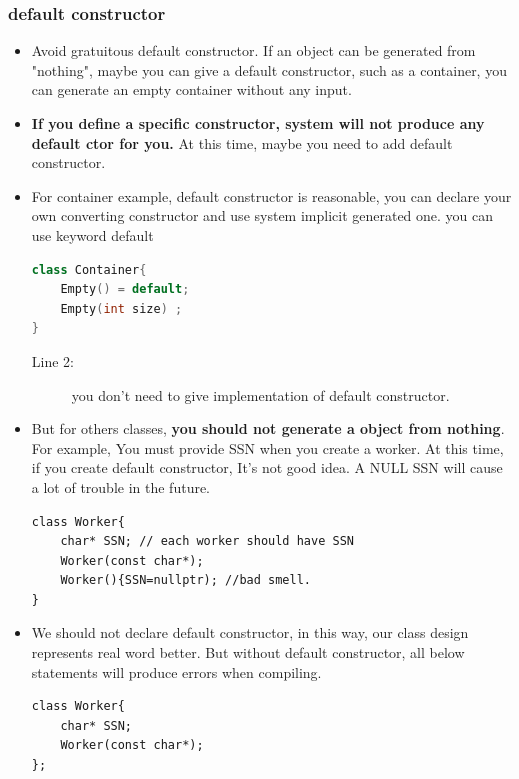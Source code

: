 \documentclass[a4paper,11pt,twoside]{book}
\begin{document}
\subsubsection{default constructor}
\begin{itemize}
	
	\item Avoid gratuitous default constructor. If an object can be generated from "nothing", maybe you can give a default constructor, such as a container, you can generate an empty container without any input. 

	\item \textbf{If you define a specific constructor, system will not produce any default ctor for you.} At this time, maybe you need to add default constructor.
	
	\item For container example, default constructor is reasonable, you can declare your own converting constructor and use system implicit generated one. you can use keyword default
\begin{lstlisting}[frame=single, language=c++]
class Container{
	Empty() = default;
	Empty(int size) ;
}
\end{lstlisting}

	\begin{description}
		\item[Line 2:] you don't need to give implementation of default constructor.
	\end{description}
	
	
	\item But for others classes, \textbf{you should not generate a object from nothing}. For example, You must provide SSN when you create a worker. At this time, if you create default constructor, It's not good idea. A NULL SSN will cause a lot of trouble in the future. 
\begin{lstlisting}[numbers=none]
class Worker{
	char* SSN; // each worker should have SSN
	Worker(const char*);
	Worker(){SSN=nullptr); //bad smell.
}
\end{lstlisting}
	
	\item We should not declare default constructor, in this way, our class design represents real word better. But without default constructor, all below statements will produce errors when compiling.
	
\begin{lstlisting}
class Worker{
	char* SSN;
	Worker(const char*); 
};


\end{lstlisting}
\end{itemize}
\end{document}
